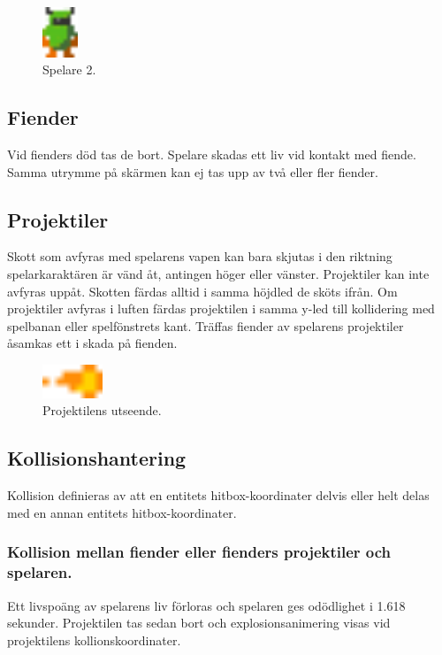 \documentclass{TDP005mall}
\begin{document}
\begin{figure}[h!]
  \includegraphics[height=1.5cm]{images/sgreen_player.png}
  \caption{Spelare 2.\label{fig:5}}
\end{figure}

\subsection{Fiender}
Vid fienders död tas de bort. Spelare skadas ett liv vid kontakt med fiende. Samma utrymme på skärmen kan ej tas upp av två eller fler fiender.
\newpage
\subsection{Projektiler}
Skott som avfyras med spelarens vapen kan bara skjutas i den riktning spelarkaraktären är vänd åt, antingen höger eller vänster. Projektiler kan inte avfyras uppåt. Skotten färdas alltid i samma höjdled de sköts ifrån. Om projektiler avfyras i luften färdas projektilen i samma y-led till kollidering med spelbanan eller spelfönstrets kant. Träffas fiender av spelarens projektiler åsamkas ett i skada på fienden.

\begin{figure}[h!]
  \includegraphics[height=1cm]{images/sexplosion_sprite_s.png}
  \caption{Projektilens utseende.\label{fig:6}}
\end{figure}

\subsection{Kollisionshantering} %
Kollision definieras av att en entitets hitbox-koordinater delvis eller helt delas med en annan entitets hitbox-koordinater.
\subsubsection*{Kollision mellan fiender eller fienders projektiler och spelaren.\label{section:1}}
Ett livspoäng av spelarens liv förloras och spelaren ges odödlighet i 1.618 sekunder. Projektilen tas sedan bort och explosionsanimering visas vid projektilens kollionskoordinater.
\end{document}
